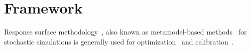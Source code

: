 \section{Framework}

Response surface methodology~\cite{box51response,carley04response}, also known as metamodel-based methods~\cite{barton06metamodel} for stochastic simulations is generally used for optimization~\cite{neddermeijer00response} and calibration~\cite{fadikar17emulation, lamperti18calibration}.